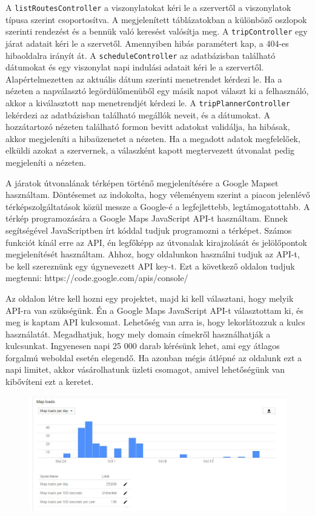 A \texttt{listRoutesController} a viszonylatokat kéri le a szervertől a viszonylatok típusa szerint csoportosítva. A megjelenített táblázatokban a különböző oszlopok szerinti rendezést és a bennük való keresést valósítja meg.
A \texttt{tripController} egy járat adatait kéri le a szervetől. Amennyiben hibás paramétert kap, a 404-es hibaoldalra irányít át.
A \texttt{scheduleController} az adatbázisban található dátumokat és egy viszonylat napi indulási adatait kéri le a szervertől. Alapértelmezetten az aktuális dátum szerinti menetrendet kérdezi le. Ha a nézeten a napválasztó legördülőmenüből egy másik napot választ ki a felhasználó, akkor a kiválasztott nap menetrendjét kérdezi le.
A \texttt{tripPlannerController} lekérdezi az adatbázisban található megállók neveit, és a dátumokat. A hozzátartozó nézeten található formon bevitt adatokat validálja, ha hibásak, akkor megjeleníti a hibaüzenetet a nézeten. Ha a megadott adatok megfelelőek, elküldi azokat a szervernek, a válaszként kapott megtervezett útvonalat pedig megjeleníti a nézeten.


A járatok útvonalának térképen történő megjelenítésére a Google Mapset használtam. Döntésemet az indokolta, hogy véleményem szerint a piacon jelenlévő térképszolgáltatások közül messze a Google-é a legfejlettebb, legtámogatottabb. A térkép programozására a Google Maps JavaScript API-t használtam. Ennek segítségével JavaScriptben írt kóddal tudjuk programozni a térképet. Számos funkciót kínál erre az API, én legfőképp az útvonalak kirajzolását és jelölőpontok megjelenítését használtam. Ahhoz, hogy oldalunkon használni tudjuk az API-t, be kell szereznünk egy úgynevezett API key-t. Ezt a következő oldalon tudjuk megtenni: https://code.google.com/apis/console/

Az oldalon létre kell hozni egy projektet, majd ki kell választani, hogy melyik API-ra van szükségünk. Én a Google Maps JavaScript API-t választottam ki, és meg is kaptam API kulcsomat. Lehetőség van arra is, hogy lekorlátozzuk a kulcs használatát. Megadhatjuk, hogy mely domain címekről használhatják a kulcsunkat. Ingyenesen napi 25 000 darab kérésünk lehet, ami egy átlagos forgalmú weboldal esetén elegendő. Ha azonban mégis átlépné az oldalunk ezt a napi limitet, akkor vásárolhatunk üzleti csomagot, amivel lehetőségünk van kibővíteni ezt a keretet.

\begin{figure}[htb]
\centering
\includegraphics[scale=0.5]{kepek/google_maps_api_1.jpg}
\caption{}
\label{fig:google_maps_api_1}
\end{figure}

